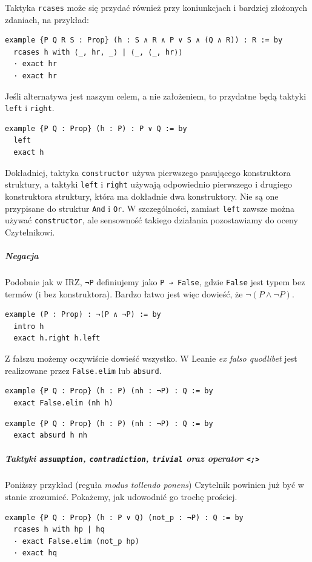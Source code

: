 \documentclass[polish,pretty,bibliography=totocnumbered]{angav}
\newcommand{\Lean}[1]{\texttt{#1}}
\begin{document}
Taktyka \Lean{rcases} może się przydać również przy koniunkcjach i bardziej złożonych zdaniach, na przykład:
\begin{verbatim}
example {P Q R S : Prop} (h : S ∧ R ∧ P ∨ S ∧ (Q ∧ R)) : R := by
  rcases h with ⟨_, hr, _⟩ | ⟨_, ⟨_, hr⟩⟩
  · exact hr
  · exact hr
\end{verbatim}

Jeśli alternatywa jest naszym celem, a nie założeniem, to przydatne będą taktyki \Lean{left} i \Lean{right}.

\begin{verbatim}
example {P Q : Prop} (h : P) : P ∨ Q := by
  left
  exact h
\end{verbatim}

\begin{remark}
    Dokładniej, taktyka \Lean{constructor} używa pierwszego pasującego konstruktora struktury, a taktyki \Lean{left} i \Lean{right} używają odpowiednio pierwszego i drugiego konstruktora struktury, która ma dokładnie dwa konstruktory. Nie są one przypisane do struktur \Lean{And} i \Lean{Or}. W szczególności, zamiast \Lean{left} zawsze można używać \Lean{constructor}, ale sensowność takiego działania pozostawiamy do oceny Czytelnikowi.
\end{remark}

\subparagraph{Negacja}
Podobnie jak w IRZ, \Lean{¬P} definiujemy jako \Lean{P → False}, gdzie \Lean{False} jest typem bez termów (i bez konstruktora). Bardzo łatwo jest więc dowieść, że $\neg (P \land \neg P)$.
\begin{verbatim}
example (P : Prop) : ¬(P ∧ ¬P) := by
  intro h
  exact h.right h.left
\end{verbatim}

Z fałszu możemy oczywiście dowieść wszystko. W Leanie \textit{ex falso quodlibet} jest realizowane przez \Lean{False.elim} lub \Lean{absurd}.
\begin{verbatim}
example {P Q : Prop} (h : P) (nh : ¬P) : Q := by
  exact False.elim (nh h)
\end{verbatim}

\begin{verbatim}
example {P Q : Prop} (h : P) (nh : ¬P) : Q := by
  exact absurd h nh
\end{verbatim}


\subparagraph{Taktyki \texttt{assumption}, \texttt{contradiction}, \texttt{trivial} oraz operator \texttt{<;>}}
Poniższy przykład (reguła \textit{modus tollendo ponens}) Czytelnik powinien już być w stanie zrozumieć. Pokażemy, jak udowodnić go trochę prościej.
\begin{verbatim}
example {P Q : Prop} (h : P ∨ Q) (not_p : ¬P) : Q := by
  rcases h with hp | hq
  · exact False.elim (not_p hp)
  · exact hq
\end{verbatim}
\end{document}

